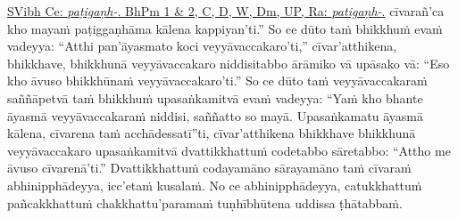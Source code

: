 {{{		\hypertarget{endnote158-appendix}{\hyperlink{endnote158-body}{SVibh Ce: \textit{paṭigaṇh-}. BhPm 1 \& 2, C, D, W, Dm, UP, Ra: \textit{patigaṇh-}.}}}}}\makeatother{} cīvarañ'ca kho mayaṁ paṭiggaṇhāma\makeatletter\hyperlink{endnote159-appendix}\makeatother{} kālena kappiyan'ti.'' So ce dūto taṁ bhikkhuṁ evaṁ vadeyya: ``Atthi pan'āyasmato koci veyyāvaccakaro'ti,'' cīvar'atthikena, bhikkhave, bhikkhunā veyyāvaccakaro niddisitabbo ārāmiko vā upāsako vā: ``Eso kho āvuso bhikkhūnaṁ veyyāvaccakaro'ti.'' So ce dūto taṁ veyyāvaccakaraṁ saññāpetvā taṁ bhikkhuṁ upasaṅkamitvā evaṁ vadeyya: ``Yaṁ kho bhante āyasmā veyyāvaccakaraṁ niddisi, saññatto so mayā. Upasaṅkamatu\makeatletter\hyperlink{endnote160-appendix}\makeatother{} āyasmā kālena, cīvarena taṁ acchādessatī''ti, cīvar'atthikena bhikkhave bhikkhunā veyyāvaccakaro upasaṅkamitvā dvattikkhattuṁ\makeatletter\hyperlink{endnote161-appendix}\makeatother{} codetabbo sāretabbo: ``Attho me āvuso cīvarenā'ti.'' Dvattikkhattuṁ\makeatletter\hyperlink{endnote162-appendix}\makeatother{} codayamāno sārayamāno\makeatletter\hyperlink{endnote163-appendix}\makeatother{} taṁ cīvaraṁ abhinipphādeyya, icc'etaṁ kusalaṁ. No ce abhinipphādeyya, catukkhattuṁ pañcakkhattuṁ chakkhattu'paramaṁ\makeatletter\hyperlink{endnote164-appendix}\makeatother{} tuṇhībhūtena\makeatletter\hyperlink{endnote165-appendix}\makeatother{} uddissa ṭhātabbaṁ.\makeatletter\hyperlink{endnote166-appendix}
